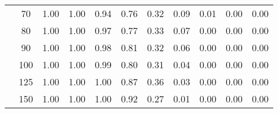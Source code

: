 \begin{table}[t]
\begin{center}
\begin{subtable}[c]{\textwidth}
\begin{center}
\begin{tabular}{rcccccccccc}
                                        & \multicolumn{1}{c|}{70}  & \num{1.00}  & \num{1.00}  & \num{0.94}  & \num{0.76}  & \num{0.32}  & \num{0.09}  & \num{0.01}  & \num{0.00}  & \num{0.00}  \\
                                        & \multicolumn{1}{c|}{80}  & \num{1.00}  & \num{1.00}  & \num{0.97}  & \num{0.77}  & \num{0.33}  & \num{0.07}  & \num{0.00}  & \num{0.00}  & \num{0.00}  \\
                                        & \multicolumn{1}{c|}{90}  & \num{1.00}  & \num{1.00}  & \num{0.98}  & \num{0.81}  & \num{0.32}  & \num{0.06}  & \num{0.00}  & \num{0.00}  & \num{0.00}  \\
                                        & \multicolumn{1}{c|}{100}  & \num{1.00}  & \num{1.00}  & \num{0.99}  & \num{0.80}  & \num{0.31}  & \num{0.04}  & \num{0.00}  & \num{0.00}  & \num{0.00}  \\
                                        & \multicolumn{1}{c|}{125}  & \num{1.00}  & \num{1.00}  & \num{1.00}  & \num{0.87}  & \num{0.36}  & \num{0.03}  & \num{0.00}  & \num{0.00}  & \num{0.00}  \\
                                        & \multicolumn{1}{c|}{150}  & \num{1.00}  & \num{1.00}  & \num{1.00}  & \num{0.92}  & \num{0.27}  & \num{0.01}  & \num{0.00}  & \num{0.00}  & \num{0.00}  \\
                                    \end{tabular}
            \end{center}
        \end{subtable}

        \vspace{5mm}


\end{center}
\end{table}
